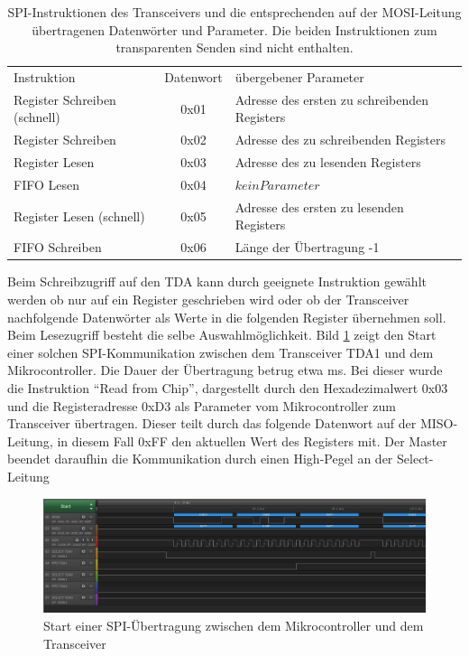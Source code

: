 \begin{table}[tbh]
	\centering
	\begin{tabular}{lcl}
		
		Instruktion & Datenwort & übergebener Parameter  \\
		Register Schreiben (schnell) & 0x01 & Adresse des ersten zu schreibenden Registers   \\
		Register Schreiben & 0x02 & Adresse des zu schreibenden Registers   \\  
		Register Lesen & 0x03 & Adresse des zu lesenden Registers   \\  
		FIFO Lesen & 0x04 &  $kein Parameter$ \\  
		Register Lesen (schnell) & 0x05 & Adresse des ersten zu lesenden Registers   \\  
		FIFO Schreiben & 0x06 & Länge der Übertragung -1   \\  
	\end{tabular}
	\caption{SPI-Instruktionen des Transceivers und die entsprechenden auf der MOSI-Leitung übertragenen Datenwörter und Parameter. Die beiden Instruktionen zum transparenten Senden sind nicht enthalten. }
	\label{tab:SPIcommands}
\end{table}







Beim Schreibzugriff auf den TDA kann durch geeignete Instruktion gewählt werden ob nur auf ein Register geschrieben wird oder ob der Transceiver nachfolgende Datenwörter als Werte in die folgenden Register übernehmen soll. 
Beim Lesezugriff besteht die selbe Auswahlmöglichkeit. Bild \ref{fig:spistart} zeigt den Start einer solchen \ac{SPI}-Kommunikation zwischen dem Transceiver TDA1 und dem Mikrocontroller. Die Dauer der Übertragung betrug etwa \unit[0,26]{ms}. Bei dieser wurde die Instruktion \enquote{Read from Chip}, dargestellt durch den Hexadezimalwert 0x03 und die Registeradresse 0xD3 als Parameter vom Mikrocontroller zum Transceiver übertragen. Dieser teilt durch das folgende Datenwort auf der \ac{MISO}-Leitung, in diesem Fall 0xFF den aktuellen Wert des Registers mit. Der Master beendet daraufhin die Kommunikation durch einen High-Pegel an der Select-Leitung


\begin{figure}[h]
\centering
\includegraphics[width=\linewidth]{"Abbildungen/Aufnahmen/Bilder/Logic Analyser/SPI_Start"}
\caption{Start einer SPI-Übertragung zwischen dem Mikrocontroller und dem Transceiver}
\label{fig:spistart}
\end{figure}


